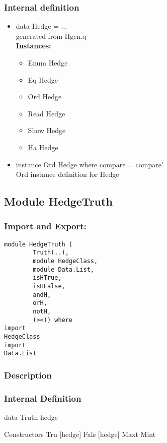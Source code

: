 \documentclass[../gr-final.tex]{subfiles}
\begin{document}
\subsubsection{Internal definition}
\begin{itemize}
        \item data Hedge = ... \\
                generated from Hgen.q\\
                {\bfseries Instances: }
         \begin{itemize}
                 \item Enum Hedge 
                 \item Eq Hedge 
                 \item Ord Hedge
                 \item Read Hedge 
                 \item Show Hedge 
                 \item Ha Hedge
        \end{itemize}
        \item instance Ord Hedge where compare = compare'\\
                Ord instance definition for Hedge                
\end{itemize}

\subsection{Module HedgeTruth}
\subsubsection{Import and Export:}
\begin{lstlisting}
module HedgeTruth (
        Truth(..),
        module HedgeClass,
        module Data.List,
        isHTrue,
        isHFalse,
        andH,
        orH,
        notH,
        (><)) where
import
HedgeClass
import
Data.List
\end{lstlisting}
\subsubsection{Description}

\subsubsection{Internal Definition}
data Truth hedge

Constructors
Tru [hedge]
Fals [hedge]
Maxt 
Mint 
\end{document}
